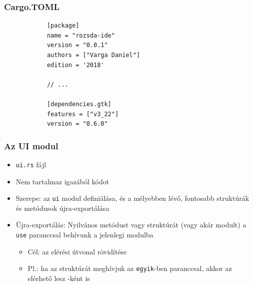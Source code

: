 \documentclass{beamer}
\begin{document}
    \begin{frame}[fragile]
        \frametitle{Cargo.TOML}

        \begin{lstlisting}
            [package]
            name = "rozsda-ide"
            version = "0.0.1"
            authors = ["Varga Daniel"]
            edition = '2018'
            
            // ...
            
            [dependencies.gtk]
            features = ["v3_22"]
            version = "0.6.0"
        \end{lstlisting}
    \end{frame}

    \begin{frame}[fragile]
        \frametitle{Az UI modul}

        \begin{itemize}
            \item \texttt{ui.rs} fájl
            \item Nem tartalmaz igazából kódot
            \item Szerepe: az \texttt{ui} modul definiálása, és a mélyebben lévő, fontosabb struktúrák és metódusok újra-exportálása
            \item Újra-exportálás: Nyilvános metódust vagy struktúrát (vagy akár modult) a \texttt{use} paranccsal behívunk a jelenlegi modulba \begin{itemize}
                \item Cél: az elérési útvonal rövidítése
                \item Pl.: ha az  struktúrát meghívjuk az \texttt{egyik}-ben  paranccsal,
                akkor az elérhető lesz -ként is 
            \end{itemize}
        \end{itemize}
    \end{frame}
\end{document}
